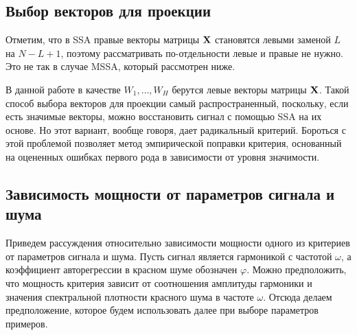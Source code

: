 \documentclass[specialist,
substylefile = spbu_report.rtx,
subf,href,colorlinks=true, 12pt]{disser}
\theoremstyle{definition}
\begin{document}
\subsection{Выбор векторов для проекции}\label{sect:vectors_choise}
Отметим, что в SSA правые векторы матрицы $\mathbf{X}$ становятся левыми заменой $L$ на $N-L+1$, поэтому рассматривать по-отдельности левые и правые не нужно. Это не так в случае MSSA, который рассмотрен ниже.

В данной работе в качестве $W_1, \ldots,W_H$ берутся левые векторы матрицы $\mathbf{X}$. Такой способ выбора векторов для проекции самый распространенный, поскольку, если есть значимые векторы, можно восстановить сигнал с помощью SSA на их основе. Но этот вариант, вообще говоря, дает радикальный критерий. Бороться с этой проблемой позволяет метод эмпирической поправки критерия, основанный на оцененных ошибках первого рода в зависимости
от уровня значимости.

\subsection{Зависимость мощности от параметров сигнала и шума}

Приведем рассуждения относительно зависимости мощности одного из критериев от параметров сигнала и шума. Пусть сигнал является гармоникой с частотой $\omega$, а коэффициент авторегрессии в красном шуме обозначен $\varphi$.
Можно предположить, что мощность критерия зависит от соотношения амплитуды гармоники и значения спектральной плотности красного шума в частоте $\omega$. Отсюда делаем предположение, которое будем использовать далее при выборе параметров примеров.
\end{document}
